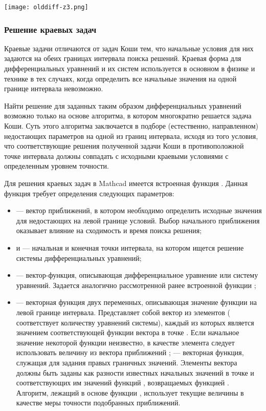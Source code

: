 \begin{center}
	\texttt{[image: olddiff-z3.png]}
\end{center}


\subsubsection*{Решение краевых задач}

Краевые задачи отличаются от задач Коши тем, что начальные условия для них задаются на обеих границах интервала поиска решений. Краевая форма для дифференциальных уравнений и их систем используется в основном в физике и технике в тех случаях, когда определить все начальные значения на одной границе интервала невозможно. 

Найти решение для заданных таким образом дифференциальных уравнений возможно только на основе алгоритма, в котором многократно решается задача Коши. Суть этого алгоритма заключается в подборе (естественно, направленном) недостающих параметров на одной из границ интервала, исходя из того условия, что соответствующие решения полученной задачи Коши в противоположной точке интервала должны совпадать с исходными краевыми условиями с определенным уровнем точности.

Для решения краевых задач в Mathcad имеется встроенная функция . Данная функция требует определения следующих параметров:
\begin{itemize}[label={}]
	\item {} --- вектор приближений, в котором необходимо определить исходные значения для недостающих на левой границе условий. Выбор начального приближения оказывает влияние на сходимость и время поиска решения;
	\item {} и  --- начальная и конечная точки интервала, на котором ищется решение системы дифференциальных уравнений;
	\item {} --- вектор-функция, описывающая дифференциальное уравнение или систему уравнений. Задается аналогично рассмотренной ранее встроенной функции ;
	\item {} --- векторная функция двух переменных, описывающая значение функции на левой границе интервала. Представляет собой вектор из  элементов ( соответствует количеству уравнений системы), каждый из которых является значением соответствующей функции вектора  в точке . Если начальное значение некоторой функции неизвестно, в качестве элемента  следует использовать величину из вектора приближений ;
	 --- векторная функция, служащая для задания правых граничных значений. Элементы вектора  должны быть заданы как разности известных начальных значений в точке  и соответствующих им значений функций , возвращаемых функцией . Алгоритм, лежащий в основе функции , использует текущие величины  в качестве меры точности подобранных приближений. 
\end{itemize}

